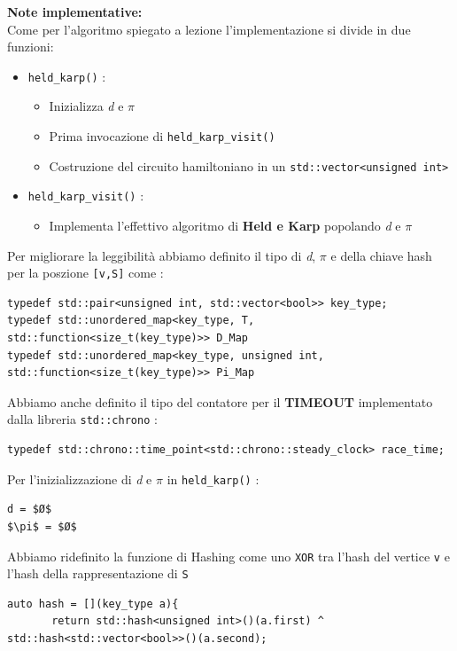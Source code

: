 \documentclass[]{article}
\begin{document}
\begin{flushleft}
\textbf{Note implementative:}\\
Come per l'algoritmo spiegato a lezione l'implementazione si divide in due funzioni: 
\begin{itemize}
\item \verb|held_karp()| :
\begin{itemize}
\item Inizializza \textit{d} e $\pi$
\item Prima invocazione di \verb|held_karp_visit()|
\item Costruzione del circuito hamiltoniano in un \verb|std::vector<unsigned int>|
\end{itemize}
\item \verb|held_karp_visit()| :
\begin{itemize}
\item Implementa l'effettivo algoritmo di \textbf{Held e Karp} popolando \textit{d} e $\pi$
\end{itemize}
\end{itemize}
Per migliorare la leggibilità abbiamo definito il tipo di \textit{d}, $\pi$ e della chiave hash per la poszione \verb|[v,S]| come :
\lstset{language=c++, style=mystyle, firstnumber=1}
\begin{lstlisting}
typedef std::pair<unsigned int, std::vector<bool>> key_type;
typedef std::unordered_map<key_type, T, std::function<size_t(key_type)>> D_Map
typedef std::unordered_map<key_type, unsigned int, std::function<size_t(key_type)>> Pi_Map
\end{lstlisting}
Abbiamo anche definito il tipo del contatore per il \textbf{TIMEOUT} implementato dalla libreria \verb|std::chrono| :
\lstset{language=c++, style=mystyle, firstnumber=4}
\begin{lstlisting}
typedef std::chrono::time_point<std::chrono::steady_clock> race_time;
\end{lstlisting}
\medskip
Per l'inizializzazione di \textit{d} e $\pi$ in \verb|held_karp()| : 
\begin{lstlisting}[mathescape=true]
d = $Ø$
$\pi$ = $Ø$
\end{lstlisting}
Abbiamo ridefinito la funzione di Hashing come uno \verb|XOR| tra l'hash del vertice \verb|v| e l'hash della rappresentazione di \verb|S|
\lstset{language=c++, style=mystyle, firstnumber=35}
\begin{lstlisting}
auto hash = [](key_type a){
       return std::hash<unsigned int>()(a.first) ^ std::hash<std::vector<bool>>()(a.second);

\end{lstlisting}
\end{flushleft}
\end{document}
